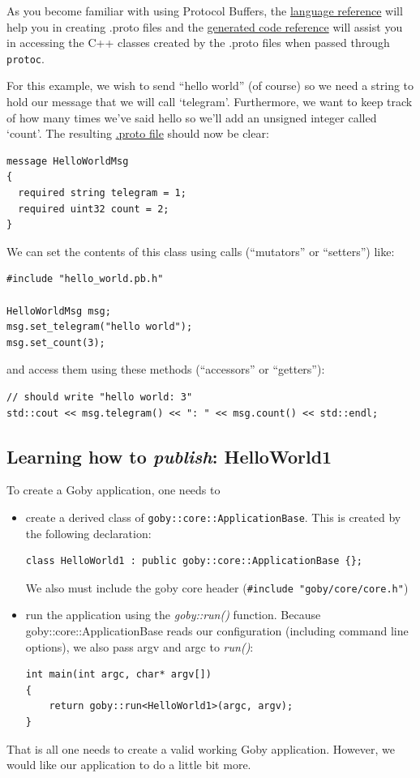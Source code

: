 \documentclass[11pt, letterpaper]{article}
\begin{document}
As you become familiar with using Protocol Buffers, the \href{http://code.google.com/apis/protocolbuffers/docs/proto.html}{language reference} will help you in creating .proto files and the \href{http://code.google.com/apis/protocolbuffers/docs/reference/cpp-generated.html}{generated code reference} will assist you in accessing the C++ classes created by the .proto files when passed through \texttt{protoc}.

For this example, we wish to send ``hello world'' (of course) so we need a string to hold our message that we will call `telegram'. Furthermore, we want to keep track of how many times we've said hello so we'll add an unsigned integer called `count'. The resulting \href{http://bazaar.launchpad.net/~goby-dev/goby/trunk/annotate/head:/src/core/examples/ex1_hello_world/hello_world.proto}{.proto file} should now be clear:
\begin{verbatim}
message HelloWorldMsg
{
  required string telegram = 1;
  required uint32 count = 2;
}
\end{verbatim}

We can set the contents of this class using calls (``mutators'' or ``setters'') like:
\begin{verbatim}
#include "hello_world.pb.h"

HelloWorldMsg msg;
msg.set_telegram("hello world");
msg.set_count(3);
\end{verbatim}

and access them using these methods (``accessors'' or ``getters''):

\begin{verbatim}
// should write "hello world: 3"
std::cout << msg.telegram() << ": " << msg.count() << std::endl;
\end{verbatim}


\subsection{Learning how to \textit{publish}: HelloWorld1}

To create a Goby application, one needs to

\begin{itemize}
\item create a derived class of \texttt{goby::core::ApplicationBase}. This is created by the following declaration:
\begin{verbatim}
class HelloWorld1 : public goby::core::ApplicationBase {};
\end{verbatim}
We also must include the goby core header (\texttt{\#include "goby/core/core.h"})
\item run the application using the \textit{goby::run()} function. Because goby::core::ApplicationBase reads our configuration (including command line options), we also pass argv and argc to \textit{run()}:
\begin{verbatim}
int main(int argc, char* argv[])
{   
    return goby::run<HelloWorld1>(argc, argv);
}
\end{verbatim}
\end{itemize}
That is all one needs to create a valid working Goby application. However, we would like our application to do a little bit more.
\end{document}
